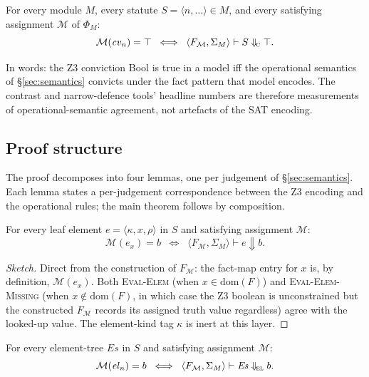 \begin{theorem}
\label{thm:z3-sound}
For every module $M$, every statute $S = \langle n, \ldots
\rangle \in M$, and every satisfying assignment $\mathcal{M}$ of
$\Phi_M$:
\[
  \mathcal{M}(\mathit{cv}_n) = \top
  \;\;\Longleftrightarrow\;\;
  \langle F_\mathcal{M}, \Sigma_M \rangle
  \vdash S \Downarrow_{\!\textsc{c}} \top.
\]
\end{theorem}

In words: the Z3 conviction Bool is true in a model iff the
operational semantics of \S\ref{sec:semantics} convicts under the
fact pattern that model encodes. The contrast and
narrow-defence tools' headline numbers are therefore
measurements of operational-semantic agreement, not artefacts of
the SAT encoding.

\subsection{Proof structure}
\label{subsec:soundness-proof}

The proof decomposes into four lemmas, one per judgement of
\S\ref{sec:semantics}. Each lemma states a per-judgement
correspondence between the Z3 encoding and the operational
rules; the main theorem follows by composition.

\begin{lemma}
\label{lem:soundness-elem}
For every leaf element $e = \langle \kappa, x, \rho \rangle$ in
$S$ and satisfying assignment $\mathcal{M}$:
\[
  \mathcal{M}(e_x) = b
  \;\;\Longleftrightarrow\;\;
  \langle F_\mathcal{M}, \Sigma_M \rangle \vdash e
  \Downarrow b.
\]
\end{lemma}

\begin{proof}[Sketch]
Direct from the construction of $F_\mathcal{M}$: the fact-map
entry for $x$ is, by definition, $\mathcal{M}(e_x)$. Both
\textsc{Eval-Elem} (when $x \in \mathrm{dom}(F)$) and
\textsc{Eval-Elem-Missing} (when $x \notin \mathrm{dom}(F)$, in
which case the Z3 boolean is unconstrained but the constructed
$F_\mathcal{M}$ records its assigned truth value regardless)
agree with the looked-up value. The element-kind tag $\kappa$ is
inert at this layer.
\end{proof}

\begin{lemma}
\label{lem:soundness-graph}
For every element-tree $\mathit{Es}$ in $S$ and satisfying
assignment $\mathcal{M}$:
\[
  \mathcal{M}(\mathit{el}_n) = b
  \;\;\Longleftrightarrow\;\;
  \langle F_\mathcal{M}, \Sigma_M \rangle \vdash
  \mathit{Es} \Downarrow_{\!\textsc{el}} b.
\]
\end{lemma}

